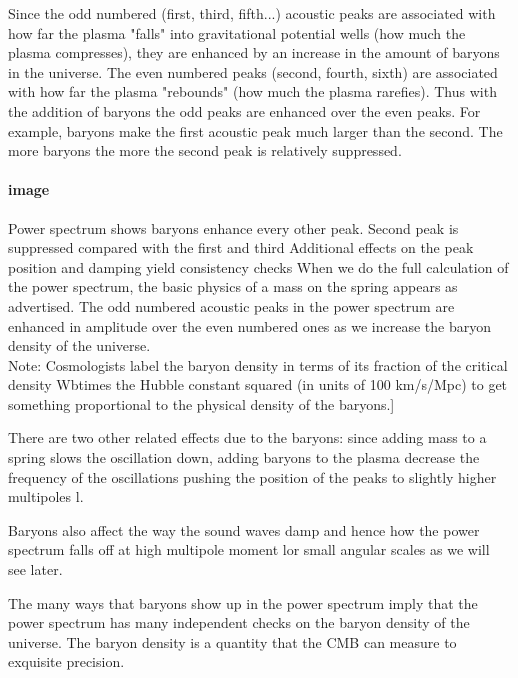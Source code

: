 \documentclass{article}
\begin{document}
Since the odd numbered (first, third, fifth...) acoustic peaks are associated with how far the plasma "falls" into gravitational potential wells (how much the plasma compresses), they are enhanced by an increase in the amount of baryons in the universe.   The even numbered peaks (second, fourth, sixth) are associated with how far the plasma "rebounds" (how much the plasma rarefies).  Thus with the addition of baryons the odd peaks are enhanced over the even peaks.  For example, baryons make the first acoustic peak much larger than the second.  The more baryons the more the second peak is relatively suppressed. 
\par

\paragraph{image}
Power spectrum shows baryons enhance every other peak.
Second peak is suppressed compared with the first and third
Additional effects on the peak position and damping yield consistency checks
When we do the full calculation of the power spectrum, the basic physics of a mass on the spring appears as advertised.   The odd numbered acoustic peaks in the power spectrum are enhanced in amplitude over the even numbered ones as we increase the baryon density of the universe.\\
Note: Cosmologists label the baryon density in terms of its fraction of the critical density Wbtimes the Hubble constant squared (in units of 100 km/s/Mpc) to get something proportional to the physical density of the baryons.]

There are two other related effects due to the baryons:  since adding mass to a spring slows the oscillation down, adding baryons to the plasma decrease the frequency of the oscillations pushing the position of the peaks to slightly higher multipoles l.

Baryons also affect the way the sound waves damp and hence how the power spectrum falls off at high multipole moment lor small angular scales as we will see later.

The many ways that baryons show up in the power spectrum imply that the power spectrum has many independent checks on the baryon density of the universe.  The baryon density is a quantity that the CMB can measure to exquisite precision.
\end{document}
